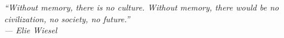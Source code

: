 \clearpage
\thispagestyle{plain}

\vspace*{\fill}
\begin{center}
\begin{minipage}{0.75\linewidth}
\itshape
\raggedleft
``Without memory, there is no culture. Without memory, there would be no civilization, no society, no future.''\\[1em]
\upshape
--- Elie Wiesel
\end{minipage}
\end{center}
\vspace*{\fill}
\clearpage
